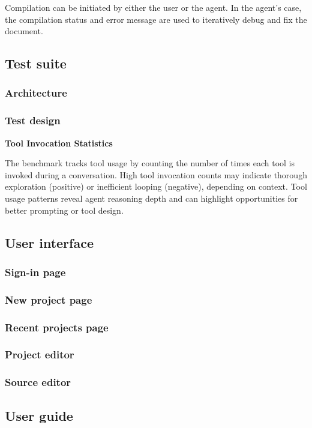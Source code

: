 Compilation can be initiated by either the user or the agent.
In the agent's case, the compilation status and error message are used to iteratively debug and fix the document.

\subsection{Test suite}

\subsubsection{Architecture}
\subsubsection{Test design}

\textbf{Tool Invocation Statistics}

The benchmark tracks tool usage by counting the number of times each tool is invoked during a conversation.
High tool invocation counts may indicate thorough exploration (positive) or inefficient looping (negative), depending on context.
Tool usage patterns reveal agent reasoning depth and can highlight opportunities for better prompting or tool design.

\subsection{User interface}

\subsubsection{Sign-in page}
\subsubsection{New project page}
\subsubsection{Recent projects page}
\subsubsection{Project editor}
\subsubsection{Source editor}

\subsection{User guide}

